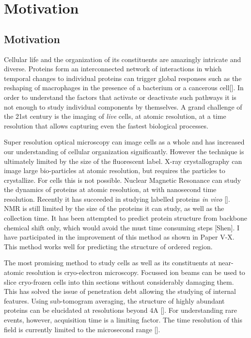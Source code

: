 \part{Motivation}
\chapter{Motivation}
Cellular life and the organization of its constituents are amazingly intricate and diverse. Proteins form an interconnected network of interactions in which temporal changes to individual proteins can trigger global responses such as the reshaping of macrophages in the presence of a bacterium or a cancerous cell[]. In order to understand the factors that activate or deactivate such pathways it is not enough to study individual components by themselves. A grand challenge of the 21st century is the imaging of \textit{live} cells, at atomic resolution, at a time resolution that allows capturing even the fastest biological processes.

Super resolution optical microscopy can image cells as a whole and has increased our understanding of cellular organization significantly. However the technique is ultimately limited by the size of the fluorescent label. X-ray crystallography can image large bio-particles at atomic resolution, but requires the particles to crystallize. For cells this is not possible. Nuclear Magnetic Resonance can study the dynamics of proteins at atomic resolution, at with nanosecond time resolution. Recently it has succeeded in studying labelled proteins \textit{in vivo} []. NMR is still limited by the size of the proteins it can study, as well as the collection time. It has been attempted to predict protein structure from backbone chemical shift only, which would avoid the must time consuming steps [Shen]. I have participated in the improvement of this method as shown in Paper V-X. This method works well for predicting the structure of ordered region.

The most promising method to study cells as well as its constituents at near-atomic resolution is cryo-electron microscopy. Focussed ion beams can be used to slice cryo-frozen cells into thin sections without considerably damaging them. This has solved the issue of penetration debt allowing the studying of internal features. Using sub-tomogram averaging, the structure of highly abundant proteins can be elucidated at resolutions beyond 4A []. For understanding rare events, however, acquisition time is a limiting factor. The time resolution of this field is currently limited to the microsecond range [].


